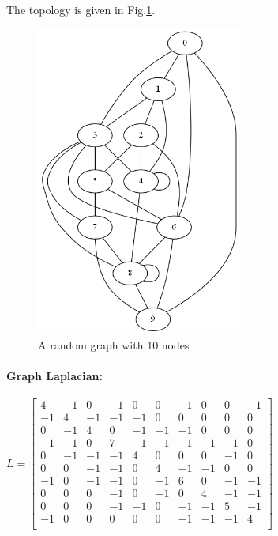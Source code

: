 \documentclass[12pt]{article}
\begin{document}
The topology is given in Fig.\ref{fig:C4}. 
\begin{figure}[htbp]
\centering
\includegraphics[width=0.6\textwidth]{./C4}
\caption{A random graph with 10 nodes}
\label{fig:C4}
\end{figure}

\paragraph{\textbf{Graph Laplacian:}}

$
L = 
\begin{bmatrix}
4 & -1 & 0 & -1 & 0 & 0 & -1 & 0 & 0 & -1 \\
-1 & 4 & -1 & -1 & -1 & 0 & 0 & 0 & 0 & 0 \\
0 & -1 & 4 & 0 & -1 & -1 & -1 & 0 & 0 & 0 \\
-1 & -1 & 0 & 7 & -1 & -1 & -1 & -1 & -1 & 0 \\
0 & -1 & -1 & -1 & 4 & 0 & 0 & 0 & -1 & 0 \\
0 & 0 & -1 & -1 & 0 & 4 & -1 & -1 & 0 & 0 \\
-1 & 0 & -1 & -1 & 0 & -1 & 6 & 0 & -1 & -1 \\
0 & 0 & 0 & -1 & 0 & -1 & 0 & 4 & -1 & -1 \\
0 & 0 & 0 & -1 & -1 & 0 & -1 & -1 & 5 & -1 \\
-1 & 0 & 0 & 0 & 0 & 0 & -1 & -1 & -1 & 4 \\
\end{bmatrix}
$
\end{document}
